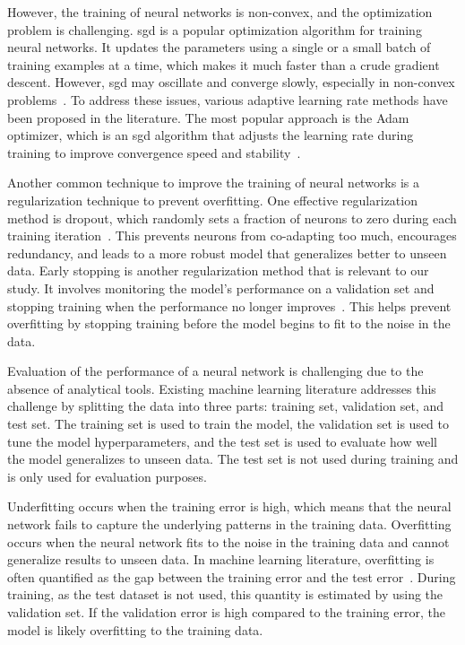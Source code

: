 However, the training of neural networks is non-convex, and the optimization problem is challenging.
\gls{sgd} is a popular optimization algorithm for training neural networks.
It updates the parameters using a single or a small batch of training examples at a time, which makes it much faster than a crude gradient descent.
However, \gls{sgd} may oscillate and converge slowly, especially in non-convex problems~\citep{bengio2016}.
To address these issues, various adaptive learning rate methods have been proposed in the literature.
The most popular approach is the Adam optimizer, which is an \gls{sgd} algorithm that adjusts the learning rate during training to improve convergence speed and stability~\citep{kingma2014adam}.

Another common technique to improve the training of neural networks is a regularization technique to prevent overfitting.
One effective regularization method is dropout, which randomly sets a fraction of neurons to zero during each training iteration~\citep{srivastava2014dropout}.
This prevents neurons from co-adapting too much, encourages redundancy, and leads to a more robust model that generalizes better to unseen data.
Early stopping is another regularization method that is relevant to our study.
It involves monitoring the model's performance on a validation set and stopping training when the performance no longer improves~\citep{prechelt2002early}.
This helps prevent overfitting by stopping training before the model begins to fit to the noise in the data.

Evaluation of the performance of a neural network is challenging due to the absence of analytical tools.
Existing machine learning literature addresses this challenge by splitting the data into three parts: training set, validation set, and test set.
The training set is used to train the model, the validation set is used to tune the model hyperparameters, and the test set is used to evaluate how well the model generalizes to unseen data.
The test set is not used during training and is only used for evaluation purposes.

Underfitting occurs when the training error is high, which means that the neural network fails to capture the underlying patterns in the training data.
Overfitting occurs when the neural network fits to the noise in the training data and cannot generalize results to unseen data.
In machine learning literature, overfitting is often quantified as the gap between the training error and the test error~\citep{bishop2006pattern}.
During training, as the test dataset is not used, this quantity is estimated by using the validation set.
If the validation error is high compared to the training error, the model is likely overfitting to the training data.

